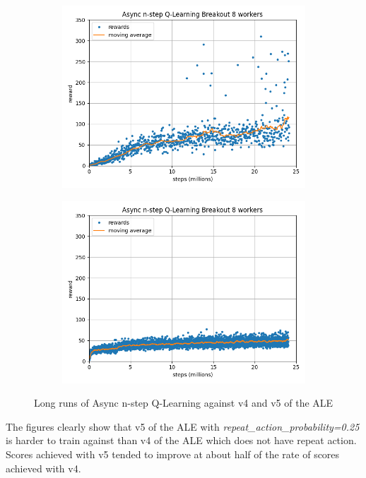 \documentclass{article}
\begin{document}
\begin{figure}[H]
\centering
\begin{subfigure}{0.49\textwidth}
\centering
\includegraphics[scale=0.4]{"n_step v4 by steps"}
\end{subfigure}
\begin{subfigure}{0.49\textwidth}
\centering
\includegraphics[scale=0.4]{"n_step v5 by steps"}
\end{subfigure}
\caption{Long runs of Async n-step Q-Learning against v4 and v5 of the ALE}
\label{fig:ASYNC1}
\end{figure}

The figures clearly show that v5 of the ALE with \emph{repeat\_action\_probability=0.25} is harder to train against than v4 of the ALE which does not have repeat action. Scores achieved with v5 tended to improve at about half of the rate of scores achieved with v4.
\end{document}
